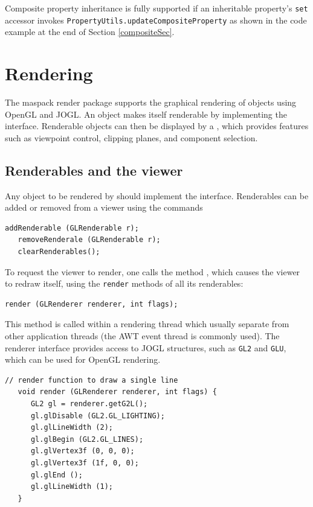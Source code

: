 \documentclass{article}
\begin{document}
Composite property inheritance is fully supported if an inheritable
property's {\tt set} accessor invokes 
{\tt PropertyUtils.update\-CompositeProperty} as shown in the code example at
the end of Section \ref{compositeSec}.

\section{Rendering}


The maspack render package supports the graphical rendering of objects
using OpenGL and JOGL. An object makes itself renderable by
implementing the  interface.  Renderable
objects can then be displayed by a , which provides
features such as viewpoint control, clipping planes, and component
selection.

\subsection{Renderables and the viewer}

Any object to be rendered by  should implement the
 interface. Renderables can be added or removed from a
viewer using the commands
\begin{lstlisting}[]
   addRenderable (GLRenderable r);
   removeRenderale (GLRenderable r);
   clearRenderables();
\end{lstlisting}
To request the viewer to render, one calls the method
, which causes the viewer to redraw
itself, using the {\tt render} methods of all its renderables:
\begin{lstlisting}[]
   render (GLRenderer renderer, int flags);
\end{lstlisting}
This method is called within a rendering thread which usually separate
from other application threads (the AWT event thread is commonly
used). The renderer interface provides access to JOGL structures,
such as {\tt GL2} and {\tt GLU}, which can be used for OpenGL rendering.

\begin{lstlisting}[]
   // render function to draw a single line
   void render (GLRenderer renderer, int flags) {
      GL2 gl = renderer.getG2L();
      gl.glDisable (GL2.GL_LIGHTING);
      gl.glLineWidth (2);
      gl.glBegin (GL2.GL_LINES);
      gl.glVertex3f (0, 0, 0);
      gl.glVertex3f (1f, 0, 0);
      gl.glEnd ();
      gl.glLineWidth (1);
   }
\end{lstlisting}
\end{document}
